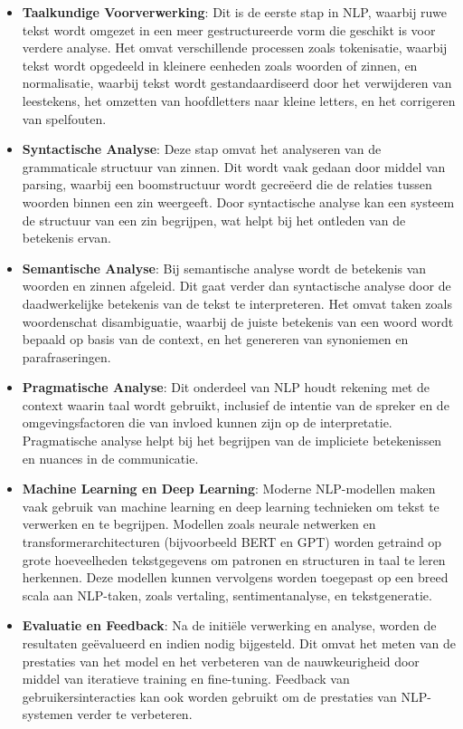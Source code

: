 \begin{itemize}
    \item \textbf{Taalkundige Voorverwerking}: Dit is de eerste stap in NLP, waarbij ruwe tekst wordt omgezet in een meer gestructureerde vorm die geschikt is voor verdere analyse. Het omvat verschillende processen zoals tokenisatie, waarbij tekst wordt opgedeeld in kleinere eenheden zoals woorden of zinnen, en normalisatie, waarbij tekst wordt gestandaardiseerd door het verwijderen van leestekens, het omzetten van hoofdletters naar kleine letters, en het corrigeren van spelfouten.
    
    \item \textbf{Syntactische Analyse}: Deze stap omvat het analyseren van de grammaticale structuur van zinnen. Dit wordt vaak gedaan door middel van parsing, waarbij een boomstructuur wordt gecreëerd die de relaties tussen woorden binnen een zin weergeeft. Door syntactische analyse kan een systeem de structuur van een zin begrijpen, wat helpt bij het ontleden van de betekenis ervan.
    
    \item \textbf{Semantische Analyse}: Bij semantische analyse wordt de betekenis van woorden en zinnen afgeleid. Dit gaat verder dan syntactische analyse door de daadwerkelijke betekenis van de tekst te interpreteren. Het omvat taken zoals woordenschat disambiguatie, waarbij de juiste betekenis van een woord wordt bepaald op basis van de context, en het genereren van synoniemen en parafraseringen.
    
    \item \textbf{Pragmatische Analyse}: Dit onderdeel van NLP houdt rekening met de context waarin taal wordt gebruikt, inclusief de intentie van de spreker en de omgevingsfactoren die van invloed kunnen zijn op de interpretatie. Pragmatische analyse helpt bij het begrijpen van de impliciete betekenissen en nuances in de communicatie.
    
    \item \textbf{Machine Learning en Deep Learning}: Moderne NLP-modellen maken vaak gebruik van machine learning en deep learning technieken om tekst te verwerken en te begrijpen. Modellen zoals neurale netwerken en transformerarchitecturen (bijvoorbeeld BERT en GPT) worden getraind op grote hoeveelheden tekstgegevens om patronen en structuren in taal te leren herkennen. Deze modellen kunnen vervolgens worden toegepast op een breed scala aan NLP-taken, zoals vertaling, sentimentanalyse, en tekstgeneratie.
    
    \item \textbf{Evaluatie en Feedback}: Na de initiële verwerking en analyse, worden de resultaten geëvalueerd en indien nodig bijgesteld. Dit omvat het meten van de prestaties van het model en het verbeteren van de nauwkeurigheid door middel van iteratieve training en fine-tuning. Feedback van gebruikersinteracties kan ook worden gebruikt om de prestaties van NLP-systemen verder te verbeteren.
\end{itemize}

